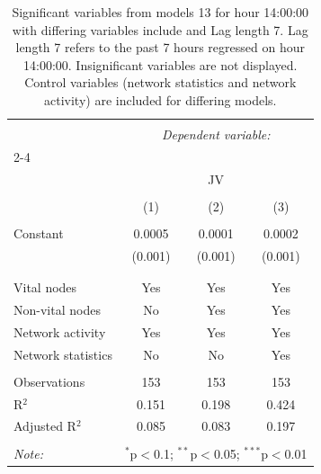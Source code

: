 
\begin{table}[!htbp] \centering 
  \caption{Significant variables from models 13 for hour 14:00:00 with differing variables include 
                               and Lag length 7. Lag length 7 refers to the past 7 hours regressed on hour 14:00:00. 
                               Insignificant variables are not displayed. 
                               Control variables (network statistics and network activity) are 
                               included for differing models.} 
  \label{Jmodels2_t_hourlagged1} 
\scriptsize 
\begin{tabular}{@{\extracolsep{5pt}}lccc} 
\\[-1.8ex]\hline 
\hline \\[-1.8ex] 
 & \multicolumn{3}{c}{\textit{Dependent variable:}} \\ 
\cline{2-4} 
\\[-1.8ex] & \multicolumn{3}{c}{JV} \\ 
\\[-1.8ex] & (1) & (2) & (3)\\ 
\hline \\[-1.8ex] 
 Constant & 0.0005 & 0.0001 & 0.0002 \\ 
  & (0.001) & (0.001) & (0.001) \\ 
  & & & \\ 
\hline \\[-1.8ex] 
Vital nodes & Yes & Yes & Yes \\ 
Non-vital nodes & No & Yes & Yes \\ 
Network activity & Yes & Yes & Yes \\ 
Network statistics & No & No & Yes \\ 
\hline &  &  &  \\ 
Observations & 153 & 153 & 153 \\ 
R$^{2}$ & 0.151 & 0.198 & 0.424 \\ 
Adjusted R$^{2}$ & 0.085 & 0.083 & 0.197 \\ 
\hline 
\hline \\[-1.8ex] 
\textit{Note:}  & \multicolumn{3}{r}{$^{*}$p$<$0.1; $^{**}$p$<$0.05; $^{***}$p$<$0.01} \\ 
\end{tabular} 
\end{table} 
